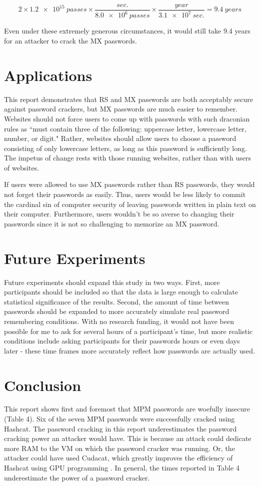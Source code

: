\documentclass{article}
\begin{document}
$$2 \times \num{1.2e15}~passes \times \frac{sec.}{\num{8.0e6}~passes} \times \frac{year}{\num{3.1e7}~sec.} = 9.4~years$$

Even under these extremely generous circumstances, it would still take 9.4 years for an attacker to crack the MX passwords.

\FloatBarrier
\section*{Applications}
This report demonstrates that RS and MX passwords are both acceptably secure against password crackers, but MX passwords are much easier to remember. Websites should not force users to come up with passwords with such draconian rules as ``must contain three of the following: uppercase letter, lowercase letter, number, or digit." Rather, websites should allow users to choose a password consisting of only lowercase letters, as long as this password is sufficiently long. The impetus of change rests with those running websites, rather than with users of websites.

If users were allowed to use MX passwords rather than RS passwords, they would not forget their passwords as easily. Thus, users would be less likely to commit the cardinal sin of computer security of leaving passwords written in plain text on their computer. Furthermore, users wouldn't be so averse to changing their passwords since it is not so challenging to memorize an MX password.

\section*{Future Experiments}
Future experiments should expand this study in two ways. First, more participants should be included so that the data is large enough to calculate statistical significance of the results. Second, the amount of time between passwords should be expanded to more accurately simulate real password remembering conditions. With no research funding, it would not have been possible for me to ask for several hours of a participant's time, but more realistic conditions include asking participants for their passwords hours or even days later - these time frames more accurately reflect how passwords are actually used.

\section*{Conclusion}
This report shows first and foremost that MPM passwords are woefully insecure (Table 4). Six of the seven MPM passwords were successfully cracked using Hashcat. The password cracking in this report underestimates the password cracking power an attacker would have. This is because an attack could dedicate more RAM to the VM on which the password cracker was running. Or, the attacker could have used Cudacat, which greatly improves the efficiency of Hashcat using GPU programming \cite{cuda}. In general, the times reported in Table 4 underestimate the power of a password cracker.
\end{document}
